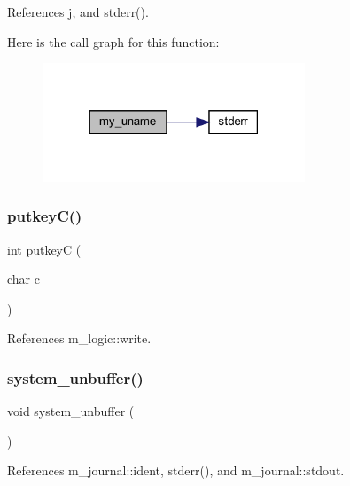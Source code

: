 References j, and stderr().

Here is the call graph for this function\+:
\nopagebreak
\begin{figure}[H]
\begin{center}
\leavevmode
\includegraphics[width=222pt]{C-M__system_8c_ab341d42a9117c4bd188dcdcbff69fe9a_cgraph}
\end{center}
\end{figure}
\mbox{\label{C-M__system_8c_a834a89f46bdca2fc961db64cf3112cdf}} 
\subsubsection{\texorpdfstring{putkey\+C()}{putkeyC()}}
{\footnotesize\ttfamily int putkeyC (\begin{DoxyParamCaption}\item[{char}]{c }\end{DoxyParamCaption})}



References m\+\_\+logic\+::write.

\mbox{\label{C-M__system_8c_ab955d6c562df08b9e465fe3cea24d83d}} 
\subsubsection{\texorpdfstring{system\+\_\+unbuffer()}{system\_unbuffer()}}
{\footnotesize\ttfamily void system\+\_\+unbuffer (\begin{DoxyParamCaption}{ }\end{DoxyParamCaption})}



References m\+\_\+journal\+::ident, stderr(), and m\+\_\+journal\+::stdout.

